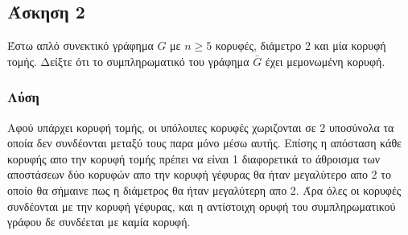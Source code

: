 \subsection*{Άσκηση 2}

Έστω απλό συνεκτικό γράφημα $G$ με $n \ge 5$ κορυφές, διάμετρο 2 και μία κορυφή τομής. 
Δείξτε ότι το συμπληρωματικό του γράφημα $\bar G$ έχει μεμονωμένη κορυφή.

\subsubsection*{Λύση}

Αφού υπάρχει κορυφή τομής, οι υπόλοιπες κορυφές χωριζονται σε 2 υποσύνολα τα οποία δεν συνδέονται μεταξύ τους 
παρα μόνο μέσω αυτής. Επίσης η απόσταση κάθε κορυφής απο την κορυφή τομής πρέπει να είναι 1 διαφορετικά
το άθροισμα των αποστάσεων δύο κορυφών απο την κορυφή γέφυρας θα ήταν μεγαλύτερο απο 2 το οποίο θα σήμαινε πως η διάμετρος
θα ήταν μεγαλύτερη απο 2. Άρα όλες οι κορυφές συνδέονται με την κορυφή γέφυρας, και η αντίστοιχη ορυφή του συμπληρωματικού γράφου
δε συνδέεται με καμία κορυφή.
